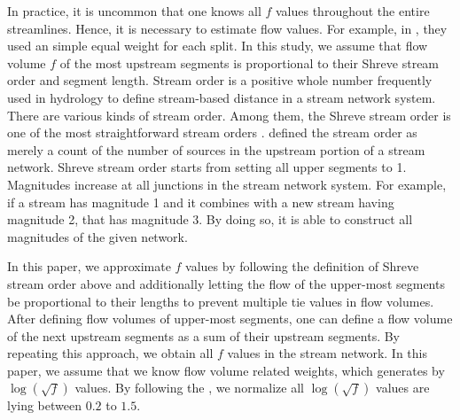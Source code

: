 \documentclass[11pt,titlepage]{article}
\begin{document}
In practice, it is uncommon that one knows all $f$ values throughout the entire streamlines. Hence, it is necessary to estimate flow values. For example, in \cite{VerHoef(2006)}, they used an simple equal weight for each split.%
In this study, we assume that flow volume $f$ of the most upstream segments is proportional to their Shreve stream order and segment length. Stream order is a positive whole number frequently used in hydrology to define stream-based distance in a stream network system. There are various kinds of stream order. Among them, the Shreve stream order is one of the most straightforward stream orders \citep{Cressie2006, VerHoef(2010)}. \cite{Cressie2006} defined the stream order as merely a count of the number of sources in the upstream portion of a stream network. Shreve stream order starts from setting all upper segments to 1. Magnitudes increase at all junctions in the stream network system. For example, if a stream has magnitude 1 and it combines with a new stream having magnitude 2, that has magnitude 3. By doing so, it is able to construct all magnitudes of the given network.

In this paper, we approximate $f$ values by following the definition of Shreve stream order above and additionally letting the flow of the upper-most segments be proportional to their lengths to prevent multiple tie values in flow volumes.
After defining flow volumes of upper-most segments, one can define a flow volume of the next upstream segments as a sum of their upstream segments. %
By repeating this approach, we obtain all $f$ values in the stream network. In this paper, we assume that we know flow volume related weights, which generates by $\log(\sqrt{f})$ values. By following the \cite{ODonnell2014}, we normalize all $\log(\sqrt{f})$ values are lying between $0.2$ to $1.5$.
	


\end{document}
